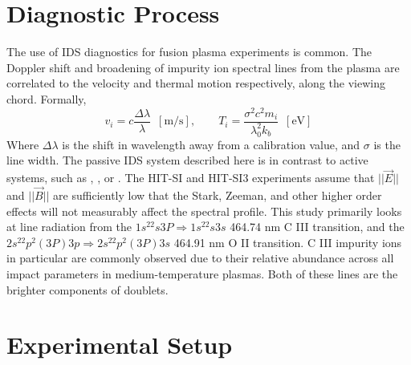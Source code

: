 
\section{Diagnostic Process}
\hspace{4ex}The use of IDS diagnostics for fusion plasma experiments is common\cite{den1994fast}. The Doppler shift and broadening of impurity ion spectral lines from the plasma are correlated to the velocity and thermal motion respectively, along the viewing chord. Formally, \\
\begin{equation}\label{Doppler_Eqns}
v_i = c\frac{\Delta\lambda}{\lambda}\,\,\,\mathrm{[m/s]},\qquad
T_i = \frac{\sigma^2c^2m_i}{\lambda_0^2k_b}\,\,\,\mathrm{[eV]}
\end{equation} 
Where $\Delta\lambda$ is the shift in wavelength away from a calibration value, and $\sigma$ is the line width. The passive IDS system described here is in contrast to active systems, such as \cite{mckee1999beam}, \cite{fonck1984determination}, or \cite{burgos2012hybrid}. The HIT-SI and HIT-SI3 experiments assume that $||\vec{E}||$ and $||\vec{B}||$ are sufficiently low that the Stark, Zeeman, and other higher order effects will not measurably affect the spectral profile. This study primarily looks at line radiation from the $1s^22s3P\Rightarrow1s^22s3s$ 464.74 nm C III transition, and the $2s^22p^2(3P)3p\Rightarrow2s^22p^2(3P)3s$ 464.91 nm O II transition. C III impurity ions in particular are commonly observed due to their relative abundance across all impact parameters in medium-temperature plasmas\cite{cothran2006fast}. Both of these lines are the brighter components of doublets. 

\section{Experimental Setup}
